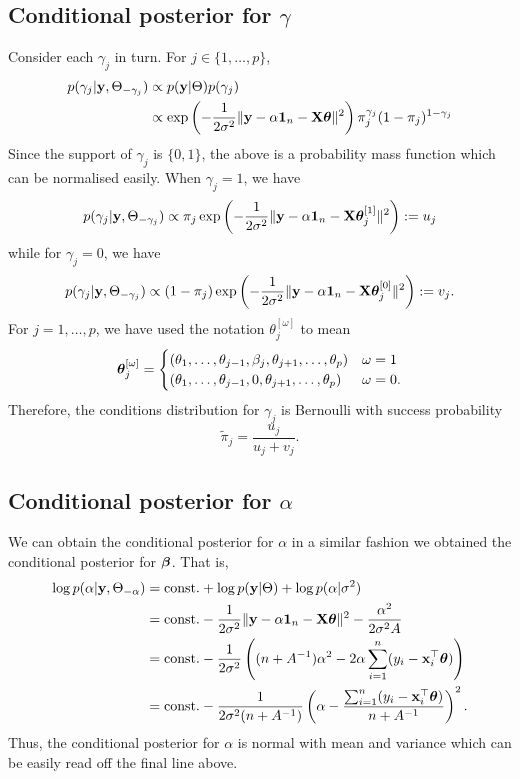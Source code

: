 \subsection{Conditional posterior for $\gamma$}

Consider each $\gamma_j$ in turn. For $j\in\{1,\dots,p\}$,
\begin{align*}
  p(\gamma_j|{\mathbf y},\Theta_{-\gamma_j}) 
  &\propto p({\mathbf y}|\Theta)p(\gamma_j) \\
  &\propto \exp\left( - \frac{1}{2\sigma^2} \Vert {\mathbf y} - \alpha {\mathbf 1}_n - {\mathbf X}{\bm\theta} \Vert^2 \right)
  \pi_j^{\gamma_j}(1-\pi_j)^{1-\gamma_j}
\end{align*}
Since the support of $\gamma_j$ is $\{0,1\}$, the above is a probability mass function which can be normalised easily.
When $\gamma_j=1$, we have 
\[
  p(\gamma_j|{\mathbf y},\Theta_{-\gamma_j}) 
  \propto \pi_j \exp\left( - \frac{1}{2\sigma^2} \Vert {\mathbf y} - \alpha {\mathbf 1}_n - {\mathbf X}{\bm\theta}_j^{[1]} \Vert^2 \right) := u_j
\]
while for $\gamma_j=0$, we have
\[
  p(\gamma_j|{\mathbf y},\Theta_{-\gamma_j}) \propto (1-\pi_j) \exp\left( - \frac{1}{2\sigma^2} \Vert {\mathbf y} - \alpha {\mathbf 1}_n - {\mathbf X}{\bm\theta}_j^{[0]} \Vert^2 \right) := v_j.
\]
For $j=1,\dots,p$, we have used the notation $\theta_j^{[\omega]}$ to mean
\[
  {\bm\theta}_j^{[\omega]} = 
  \begin{cases}
    (\theta_1,\dots,\theta_{j-1},\beta_j,\theta_{j+1},\dots,\theta_p) &\omega = 1 \\
    (\theta_1,\dots,\theta_{j-1},0,\theta_{j+1},\dots,\theta_p) &\omega = 0.
  \end{cases}
\]
Therefore, the conditions distribution for $\gamma_j$ is Bernoulli with success probability 
\[
  \tilde \pi_j = \frac{u_j}{u_j + v_j}.
\]

\subsection{Conditional posterior for $\alpha$}

We can obtain the conditional posterior for $\alpha$ in a similar fashion we obtained the conditional posterior for ${\bm\beta}$. 
That is,
\begin{align*}
  \log p(\alpha|{\mathbf y},\Theta_{-\alpha}) 
  &= \text{const.}\hspace{0.01em} + \log p({\mathbf y}|\Theta) + \log p(\alpha|\sigma^2) \\
  &= \text{const.}\hspace{0.01em} - \frac{1}{2\sigma^2} \Vert {\mathbf y} - \alpha {\mathbf 1}_n - {\mathbf X}{\bm\theta} \Vert^2  
  - \frac{\alpha^2}{2\sigma^2A} \\
  &= \text{const.}\hspace{0.01em} - \frac{1}{2\sigma^2} \left( (n+A^{-1})\alpha^2 - 2\alpha\sum_{i=1}^n(y_i - {\mathbf x}_i^\top{\bm\theta}) \right) \\
  &= \text{const.}\hspace{0.01em} - \frac{1}{2\sigma^2(n+A^{-1})} \left( \alpha - \frac{\sum_{i=1}^n(y_i - {\mathbf x}_i^\top{\bm\theta})}{n+A^{-1}}  \right)^2.
\end{align*}
Thus, the conditional posterior for $\alpha$ is normal with mean and variance which can be easily read off the final line above.

